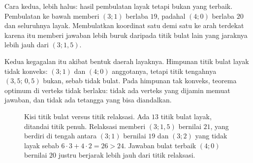 Cara kedua, lebih halus: hasil pembulatan layak tetapi bukan yang terbaik. Pembulatan ke
bawah memberi $(3;1)$ berlaba $19$, padahal $(4;0)$ berlaba $20$ dan seluruhnya layak.
Membulatkan koordinat satu demi satu ke arah terdekat karena itu memberi jawaban lebih buruk
daripada titik bulat lain yang jaraknya lebih jauh dari $(3;1{,}5)$.

Kedua kegagalan itu akibat bentuk daerah layaknya. Himpunan titik bulat layak
tidak konveks: $(3;1)$ dan $(4;0)$ anggotanya, tetapi titik tengahnya $(3{,}5;\,0{,}5)$
bukan, sebab tidak bulat. Pada himpunan tak konveks, teorema optimum di verteks tidak
berlaku: tidak ada verteks yang dijamin memuat jawaban, dan tidak ada tetangga yang bisa
diandalkan.

\begin{figure}[!ht]
\centering
{}
\caption{Kisi titik bulat versus titik relaksasi. Ada $13$ titik bulat layak, ditandai titik
penuh. Relaksasi memberi $(3;1{,}5)$ bernilai $21$, yang berdiri di tengah antara $(3;1)$
bernilai $19$ dan $(3;2)$ yang tidak layak sebab $6\cdot3+4\cdot2=26>24$. Jawaban bulat
terbaik $(4;0)$ bernilai $20$ justru berjarak lebih jauh dari titik relaksasi.}
\label{fig:ch22-kisi-relaksasi}
\end{figure}


